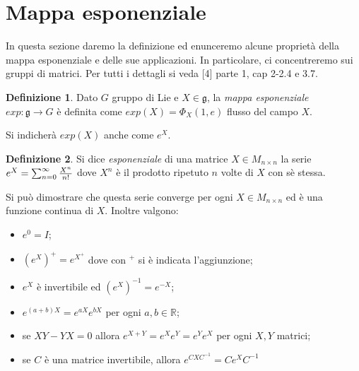 \documentclass[12pt,a4paper]{report}
\theoremstyle{definition}
\newtheorem{Def}{Definizione}[chapter]
\theoremstyle{Theorem}
\newtheorem{Prop}[Def]{Proposizione}
\theoremstyle{definition}
\theoremstyle{definition}
\theoremstyle{definition}
\begin{document}
\section{Mappa esponenziale}
In questa sezione daremo la definizione ed enunceremo alcune proprietà della mappa esponenziale e delle sue applicazioni. In particolare, ci concentreremo sui gruppi di matrici. Per tutti i dettagli si veda [4] parte 1, cap 2-2.4 e 3.7.
\begin{Def}
	Dato $G$ gruppo di Lie e $X\in\mathfrak{g}$, la \textit{mappa esponenziale} \\$exp:\mathfrak{g}\rightarrow G$ è definita come $exp(X)=\Phi_X(1,e)$ flusso del campo $X$.
\end{Def}
Si indicherà $exp(X)$ anche come $e^X$.
\begin{comment}
La mappa esponenziale verifica numerose proprietà, in particolare per i gruppi di Lie di matrici.
\begin{Prop}
Sia un gruppo di Lie di matrici, allora valgono le seguenti proprietà per la mappa esponenziale:\begin{itemize}
\item $exp(tX)=\Phi_X(t,e)$ per ogni $X\in \mathfrak{g}$ e $t\in \mathbb{R}$;
\item $exp((t+s)X)=exp(tX)\circ exp(sX)$ per ogni $X\in \mathfrak{g}$ e $s,t\in\mathbb{R}$;
\item $exp$ è analitica ed è un diffeomorfismo di un intorno di $0\in\mathfrak{g}$ in un intorno di $e\in G$;
\item ${d\over dt}\bigg{\rvert}_0exp(tX)=X$. 
\end{itemize}
\end{Prop}
Per le dimostrazioni si faccia riferimento a [2] (pag. 85, 86 cap. 2) e [3] (pag. 23 cap. 1).\\
\\
Prima di enunciare altre proprietà, è necessario definire l'esponenziale di matrice.%
\end{comment}
\begin{Def}
	Si dice \textit{esponenziale} di una matrice $X\in M_{n\times n}$ la serie \\$e^X=\sum_{n=0}^{\infty}{X^n\over n! }$ dove $X^n$ è il prodotto ripetuto $n$ volte di $X$ con sè stessa.
\end{Def}
Si può dimostrare che questa serie converge per ogni $X\in M_{n\times n}$ ed è una funzione continua di $X$. Inoltre valgono:\begin{itemize}
	\item $e^0=I$;
	\item $(e^X)^+=e^{X^+}$ dove con $^+$ si è indicata l'aggiunzione;
	\item $e^X$ è invertibile ed $(e^X)^{-1}=e^{-X}$;
	\item $e^{(a+b)X}=e^{aX}e^{bX}$ per ogni $a,b\in\mathbb{R}$;
	\item se $XY-YX=0$ allora $e^{X+Y}=e^Xe^Y=e^Ye^X$ per ogni $X,Y$ matrici;\\
	\item se $C$ è una matrice invertibile, allora $e^{CXC^{-1}}=Ce^XC^{-1}$
\end{itemize} 
\end{document}
